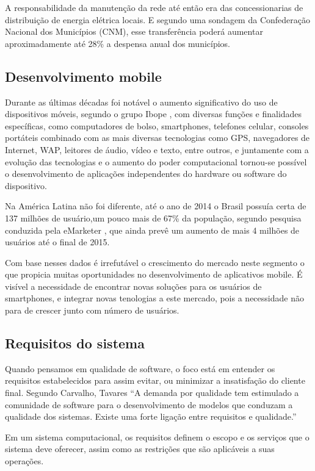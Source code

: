 \documentclass[
	article,			%
	11pt,				%
	oneside,			%
	a4paper,			%
	english,			%
	brazil,				%
	sumario=tradicional
	]{abntex2}
\begin{document}
A responsabilidade da manutenção da rede até então era das concessionarias de distribuição de energia elétrica locais.
E segundo uma sondagem da Confederação Nacional dos Municípios (CNM), esse transferência poderá aumentar aproximadamente até 28\% a despensa anual dos municípios.\cite{cdu}

\subsection{Desenvolvimento mobile}

Durante as últimas décadas foi notável o aumento significativo do uso de dispositivos móveis, segundo o grupo Ibope \cite{ibope}, com diversas funções e finalidades específicas, como computadores de bolso, smartphones, telefones celular, consoles portáteis combinado com as mais diversas tecnologias como GPS, navegadores de Internet, WAP, leitores de áudio, vídeo e texto, entre outros, e juntamente com a evolução das tecnologias e o aumento do poder computacional tornou-se possível o desenvolvimento de aplicações independentes do hardware ou software do dispositivo.

Na América Latina não foi diferente, até o ano de 2014 o Brasil possuía certa de 137 milhões de usuário,um pouco mais de 67\% da população, segundo pesquisa conduzida pela eMarketer \cite{emarketer}, que ainda prevê um aumento de mais 4 milhões de usuários até o final de 2015.

Com base nesses dados é irrefutável o crescimento do mercado neste segmento o que propicia muitas oportunidades no desenvolvimento de aplicativos mobile.
É visível a necessidade de encontrar novas soluções para os usuários de smartphones, e integrar novas tenologias a este mercado, pois a necessidade não para de crescer junto com número de usuários.

\subsection{Requisitos do sistema}

Quando pensamos em qualidade de software, o foco está em entender os requisitos estabelecidos para assim evitar, ou minimizar a insatisfação do cliente final.
Segundo Carvalho, Tavares “A demanda por qualidade tem estimulado a comunidade de software para o desenvolvimento de modelos que conduzam a qualidade dos sistemas. Existe uma forte ligação entre requisitos e qualidade.” \cite{tematec}

Em um sistema computacional, os requisitos definem o escopo e os serviços que o sistema deve oferecer, assim como as restrições que são aplicáveis a suas operações.
\end{document}
